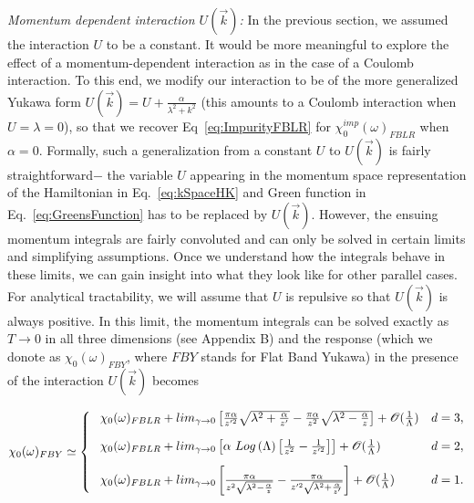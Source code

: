 \documentclass[prl,aps,twocolumn,groupaddress]{revtex4-1}
\begin{document}
\textit{Momentum dependent interaction $U(\vec k)$:} In the previous section, we assumed the interaction $U$ to be a constant. It would be more meaningful to explore the effect of a momentum-dependent interaction as in the case of a Coulomb interaction. To this end, we modify our interaction to be of the more generalized Yukawa form $U(\vec k) = U + \frac{\alpha}{\lambda^2 + k^2}$  (this amounts to a Coulomb interaction when $U=\lambda =0$), so that we recover Eq~\ref{eq:ImpurityFBLR} for $\chi_0^{imp}(\omega)_{FBLR}$ when $\alpha=0$. Formally, such a generalization from a constant $U$ to $U(\vec k)$ is fairly straightforward$-$ the variable $U$ appearing in the momentum space representation of the Hamiltonian in Eq.~\ref{eq:kSpaceHK} and Green function in Eq.~\ref{eq:GreensFunction} has to be replaced by $U(\vec k)$. However, the ensuing momentum integrals are fairly convoluted and can only be solved in certain limits and simplifying assumptions. Once we understand how the integrals behave in these limits, we can gain insight into what they look like for other parallel cases. For analytical tractability, we will assume that $U$ is repulsive so that $U(\vec k)$ is always positive. In this limit, the momentum integrals can be solved exactly as $T\rightarrow0$ in all three dimensions (see Appendix B) and the response (which we donote as $\chi_0(\omega)_{FBY}$, where $FBY$ stands for Flat Band Yukawa) in the presence of the interaction $U(\vec k)$ becomes
\begin{widetext}
\[
\chi_0(\omega)_{FBY}\simeq
\begin{cases}
\hphantom{-}\chi_0(\omega)_{FBLR} + lim_{\gamma\rightarrow0}\left[ \frac{\pi \alpha}{z'^2} \sqrt{\lambda^2 + \frac{\alpha}{z'}} - \frac{\pi \alpha}{z^2} \sqrt{\lambda^2 - \frac{\alpha}{z}} \right]+ \mathscr{O}(\frac{1}{\Lambda})&\text{$d=3$},\\[2ex]
\hphantom{-}\chi_0(\omega)_{FBLR} +  lim_{\gamma\rightarrow0}\left[ \alpha~Log\left(\Lambda\right)\left[\frac{1}{z^2} - \frac{1}{z'^2}\right]\right] +\mathscr{O}(\frac{1}{\Lambda}) &\text{$d=2$},\\[2ex]
\hphantom{-}\chi_0(\omega)_{FBLR} +  lim_{\gamma\rightarrow0}\left[\frac{\pi \alpha}{z^2 \sqrt{\lambda^2 - \frac{\alpha}{z}}} - \frac{\pi \alpha}{z'^2 \sqrt{\lambda^2 + \frac{\alpha}{z'}}}\right] + \mathscr{O}(\frac{1}{\Lambda}) &\text{$d=1$}.
\end{cases}
\]
\end{widetext}
\end{document}
